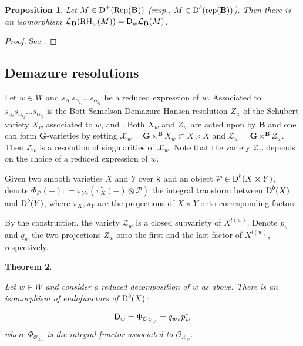 \documentclass[sn-mathphys-num]{sn-jnl}%
\newcommand{\tX}{{\mathcal X}}
\newcommand{\Oo}{\mathcal O}
\newcommand{\Ll}{\mathcal L}
\newcommand{\Zz}{{\mathcal Z}}
\newcommand{\rep}{{\mathrm{rep}}}
\newcommand{\Rep}{{\mathrm{Rep}}}
\newcommand*{\Dd}{\mathop{\mathrm D\kern0pt}\nolimits}
\newcommand{\sd}{\sf D}
\newcommand{\sk}{{\sf k}}
\newcommand{\sH}{{\sf H}}
\newcommand{\bg}{\mathbf G}
\newcommand{\fb}{\mathbf B}
\newtheorem{theorem}{Theorem}[section]
\newtheorem{proposition}[theorem]{Proposition}
\theoremstyle{definition}
\begin{document}
\begin{proposition}\label{prop:Joseph-to-Demazure}
Let $M\in \Dd ^+({\Rep}( \fb))$ (resp., $M\in \Dd ^b({\rep}( \fb))$). Then there is an isomorphism $\Ll _{\fb}({\rm R}{\sH}_w(M))={\sf D}_w\Ll _{\fb}(M)$.
\end{proposition}

\begin{proof}
See \cite[Lemma 5]{Math}.
\end{proof}

\subsection{Demazure resolutions}\label{subsec:Demres}

Let $w\in W$ and $s_{\alpha _i}s_{\alpha _{i_2}}\dots s_{\alpha _{i_k}}$ be a reduced expression of $w$. Associated to $s_{\alpha _i}s_{\alpha _{i_2}}\dots s_{\alpha _{i_k}}$ is the Bott-Samelson-Demazure-Hansen resolution $Z_w$ of the Schubert variety $X_w$ associated to $w$, \cite[Section 2.2]{BK} and \cite[Section 1.2]{WvdKTata}. Both $X_w$ and $Z_w$ are acted upon by $\fb$ and one can form $ \bg$-varieties by setting ${\mathcal X}_w= \bg\times ^{\fb}X_w\subset X\times X$ and $\Zz _w= \bg\times ^{\fb}Z_w$. Then $\Zz _w$ is a resolution of singularities of ${\mathcal X}_w$. Note that the variety $\Zz _w$ depends on the choice of a reduced expression of $w$.

Given two smooth varieties $X$ and $Y$ over $\sk$ and an object 
$\mathcal P \in \Dd ^b(X\times Y)$, denote $\Phi _{\mathcal P}(-): = {\pi _Y}_{\ast}(\pi _{X}^{\ast}(-)\otimes \mathcal P)$ the 
integral transform between $\Dd ^b(X)$ and $\Dd ^b(Y)$, where $\pi _{X}, \pi _{Y}$ are the projections of $X\times Y$ onto corresponding factors.

By the construction, the variety $\Zz _w$ is a closed subvariety of $X^{l(w)}$. Denote $p_w$ and $q_w$ the two projections $Z_w$ onto the first and the last factor of $X^{l(w)}$, respectively.


\begin{theorem}\label{th:Demazure_kernel}\cite[Corollary 2.2.7]{WvdKTata}

Let $w\in W$ and consider a reduced decomposition of $w$ as above. There is an isomorphism of endofunctors of $\Dd ^b(X)$: 

\begin{equation}
{\sd }_w=\Phi _{\Oo _{\tX _w}}={q_w}_{\ast}p_w^{\ast}
\end{equation}
where $\Phi _{\Oo _{\tX _w}}$ is the integral functor associated to $\Oo _{\tX _w}$.
\end{theorem}
\end{document}

